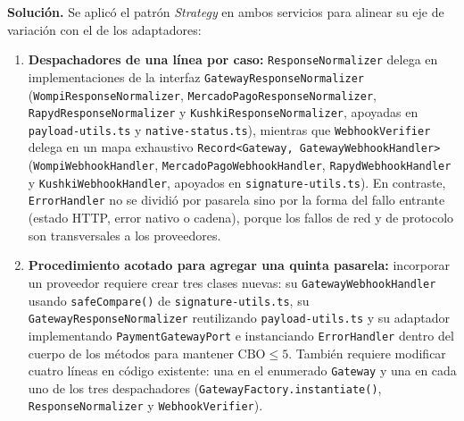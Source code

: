 \textbf{Solución.} Se aplicó el patrón \textit{Strategy} en ambos servicios para alinear su eje de variación con el de los adaptadores:
\begin{enumerate}
  \item \textbf{Despachadores de una línea por caso:} \texttt{Response\allowbreak{}Normalizer} delega en implementaciones de la interfaz \texttt{Gateway\allowbreak{}Response\allowbreak{}Normalizer} (\texttt{Wompi\allowbreak{}Response\allowbreak{}Normalizer}, \texttt{Mercado\allowbreak{}Pago\allowbreak{}Response\allowbreak{}Normalizer}, \texttt{Rapyd\allowbreak{}Response\allowbreak{}Normalizer} y \texttt{Kushki\allowbreak{}Response\allowbreak{}Normalizer}, apoyadas en \texttt{payload-\allowbreak{}utils.ts} y \texttt{native-\allowbreak{}status.ts}), mientras que \texttt{Webhook\allowbreak{}Verifier} delega en un mapa exhaustivo \texttt{Record<\allowbreak{}Gateway, Gateway\allowbreak{}Webhook\allowbreak{}Handler>} (\texttt{Wompi\allowbreak{}Webhook\allowbreak{}Handler}, \texttt{Mercado\allowbreak{}Pago\allowbreak{}Webhook\allowbreak{}Handler}, \texttt{Rapyd\allowbreak{}Webhook\allowbreak{}Handler} y \texttt{Kushki\allowbreak{}Webhook\allowbreak{}Handler}, apoyados en \texttt{signature-\allowbreak{}utils.ts}). En contraste, \texttt{ErrorHandler} no se dividió por pasarela sino por la forma del fallo entrante (estado HTTP, error nativo o cadena), porque los fallos de red y de protocolo son transversales a los proveedores.
  \item \textbf{Procedimiento acotado para agregar una quinta pasarela:} incorporar un proveedor requiere crear tres clases nuevas: su \texttt{GatewayWebhookHandler} usando \texttt{safeCompare()} de \texttt{signature-utils.ts}, su \texttt{GatewayResponseNormalizer} reutilizando \texttt{payload-utils.ts} y su adaptador implementando \texttt{PaymentGatewayPort} e instanciando \texttt{ErrorHandler} dentro del cuerpo de los métodos para mantener $\mathrm{CBO} \le 5$. También requiere modificar cuatro líneas en código existente: una en el enumerado \texttt{Gateway} y una en cada uno de los tres despachadores (\texttt{GatewayFactory.instantiate()}, \texttt{ResponseNormalizer} y \texttt{WebhookVerifier}).

\end{enumerate}
